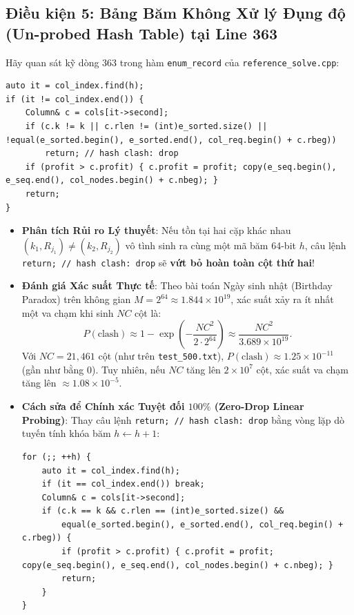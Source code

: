 \documentclass[11pt,a4paper]{article}
\theoremstyle{definition}
\begin{document}
\subsection{Điều kiện 5: Bảng Băm Không Xử lý Đụng độ (Un-probed Hash Table) tại Line 363}
Hãy quan sát kỹ dòng 363 trong hàm \texttt{enum\_record} của \texttt{reference\_solve.cpp}:
\begin{lstlisting}
auto it = col_index.find(h);
if (it != col_index.end()) {
    Column& c = cols[it->second];
    if (c.k != k || c.rlen != (int)e_sorted.size() || !equal(e_sorted.begin(), e_sorted.end(), col_req.begin() + c.rbeg))
        return; // hash clash: drop
    if (profit > c.profit) { c.profit = profit; copy(e_seq.begin(), e_seq.end(), col_nodes.begin() + c.nbeg); }
    return;
}
\end{lstlisting}
\begin{itemize}[leftmargin=1.5em]
    \item \textbf{Phân tích Rủi ro Lý thuyết}: Nếu tồn tại hai cặp khác nhau $(k_1, R_{j_1}) \neq (k_2, R_{j_2})$ vô tình sinh ra cùng một mã băm 64-bit $h$, câu lệnh \texttt{return; // hash clash: drop} sẽ \textbf{vứt bỏ hoàn toàn cột thứ hai}!
    \item \textbf{Đánh giá Xác suất Thực tế}: Theo bài toán Ngày sinh nhật (Birthday Paradox) trên không gian $M = 2^{64} \approx 1.844 \times 10^{19}$, xác suất xảy ra ít nhất một va chạm khi sinh $NC$ cột là:
    \[
        P(\text{clash}) \approx 1 - \exp\left(-\frac{NC^2}{2 \cdot 2^{64}}\right) \approx \frac{NC^2}{3.689 \times 10^{19}}.
    \]
    Với $NC = 21,461$ cột (như trên \texttt{test\_500.txt}), $P(\text{clash}) \approx 1.25 \times 10^{-11}$ (gần như bằng $0$). Tuy nhiên, nếu $NC$ tăng lên $2 \times 10^7$ cột, xác suất va chạm tăng lên $\approx 1.08 \times 10^{-5}$.
    \item \textbf{Cách sửa để Chính xác Tuyệt đối $100\%$ (Zero-Drop Linear Probing)}: Thay câu lệnh \texttt{return; // hash clash: drop} bằng vòng lặp dò tuyến tính khóa băm $h \leftarrow h + 1$:
\begin{lstlisting}
for (;; ++h) {
    auto it = col_index.find(h);
    if (it == col_index.end()) break;
    Column& c = cols[it->second];
    if (c.k == k && c.rlen == (int)e_sorted.size() &&
        equal(e_sorted.begin(), e_sorted.end(), col_req.begin() + c.rbeg)) {
        if (profit > c.profit) { c.profit = profit; copy(e_seq.begin(), e_seq.end(), col_nodes.begin() + c.nbeg); }
        return;
    }
}
\end{lstlisting}
\end{itemize}
\end{document}
